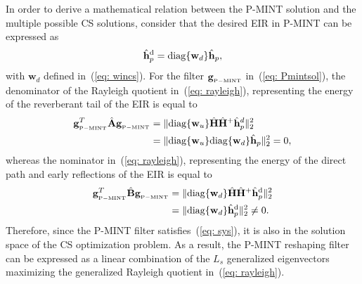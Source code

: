 \documentclass[draftcls,onecolumn,11pt]{IEEEtran}
\DeclareMathOperator{\diag}{diag}
\begin{document}
In order to derive a mathematical relation between the P-MINT solution and the multiple possible CS solutions, consider that the desired EIR in P-MINT can be expressed as
\begin{equation}
\hat{\mathbf{h}}_p^{\rm d} = {\diag}\{\mathbf{w}_d \}\hat{\mathbf{h}}_p,
\end{equation}
with $\mathbf{w}_d$ defined in~(\ref{eq: wincs}).
For the filter $\mathbf{g}_{{}_{\rm P-MINT}}$ in~(\ref{eq: Pmintsol}), the denominator of the Rayleigh quotient in~(\ref{eq: rayleigh}), representing the energy of the reverberant tail of the EIR is equal to
\begin{align}
\mathbf{g}_{{}_{\rm P-MINT}}^T \hat{\mathbf{A}} \mathbf{g}_{{}_{\rm P-MINT}} &= \|{\diag}\{\mathbf{w}_{u}\}\hat{\mathbf{H}} \hat{\mathbf{H}}^+\hat{\mathbf{h}}_p^d \|_2^2 \\
& =  \|{\diag}\{\mathbf{w}_{u}\} {\diag} \{\mathbf{w}_d \} \hat{\mathbf{h}}_p\|_2^2 = 0,
\end{align}
whereas the nominator in~(\ref{eq: rayleigh}), representing the energy of the direct path and early reflections of the EIR is equal to
\begin{align}
\mathbf{g}_{{}_{\rm P-MINT}}^T \hat{\mathbf{B}} \mathbf{g}_{{}_{\rm P-MINT}} & = \|{\diag}\{\mathbf{w}_{d}\}\hat{\mathbf{H}} \hat{\mathbf{H}}^+\hat{\mathbf{h}}_p^{\rm d} \|_2^2 \\
& =  \|{\diag}\{\mathbf{w}_{d}\} \hat{\mathbf{h}}_p^{\rm d} \|_2^2 \neq 0.
\end{align}
Therefore, since the P-MINT filter satisfies~(\ref{eq: sys}), it is also in the solution space of the CS optimization problem.
As a result, the P-MINT reshaping filter can be expressed as a linear combination of the $L_s$ generalized eigenvectors maximizing the generalized Rayleigh quotient in~(\ref{eq: rayleigh}).
\end{document}
